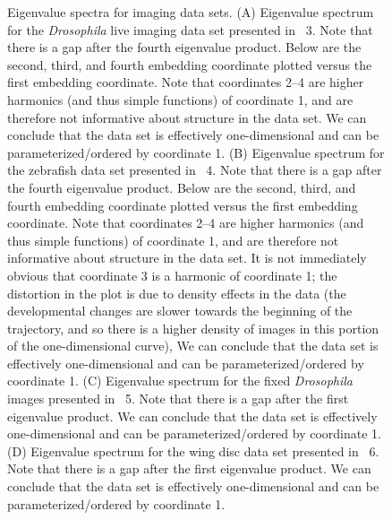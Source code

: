 \begin{figure}
\caption[Eigenvalue spectra for imaging data sets]{Eigenvalue spectra for imaging data sets. (A) Eigenvalue spectrum for the {\em Drosophila} live imaging data set presented in \fig~3. Note that there is a gap after the fourth eigenvalue product. Below are the second, third, and fourth embedding coordinate plotted versus the first embedding coordinate. Note that coordinates 2--4 are higher harmonics (and thus simple functions) of coordinate 1, and are therefore not informative about structure in the data set.  We can conclude that the data set is effectively one-dimensional and can be parameterized/ordered by coordinate 1. (B) Eigenvalue spectrum for the zebrafish data set presented in \fig~4. Note that there is a gap after the fourth eigenvalue product. Below are the second, third, and fourth embedding coordinate plotted versus the first embedding coordinate. Note that coordinates 2--4 are higher harmonics (and thus simple functions) of coordinate 1, and are therefore not informative about structure in the data set.  It is not immediately obvious that coordinate 3 is a harmonic of coordinate 1; the distortion in the plot is due to density effects in the data (the developmental changes are slower towards the beginning of the trajectory, and so there is a higher density of images in this portion of the one-dimensional curve), We can conclude that the data set is effectively one-dimensional and can be parameterized/ordered by coordinate 1. (C) Eigenvalue spectrum for the fixed {\em Drosophila} images presented in \fig~5. Note that there is a gap after the first eigenvalue product. We can conclude that the data set is effectively one-dimensional and can be parameterized/ordered by coordinate 1. (D) Eigenvalue spectrum for the wing disc data set presented in \fig~6. Note that there is a gap after the first eigenvalue product. We can conclude that the data set is effectively one-dimensional and can be parameterized/ordered by coordinate 1. }
\label{fig:eigenvalues_images}
\end{figure}


